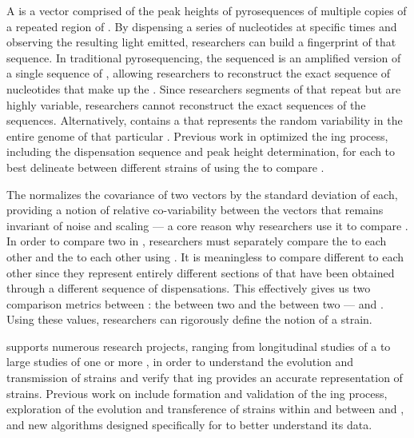 A \pyro{} is a vector comprised of the peak heights of pyrosequences of multiple copies of a repeated region of \dna{}.
By dispensing a series of nucleotides at specific times and observing the resulting light emitted, \cplop{} researchers can build a fingerprint of that \dna{} sequence.
In traditional pyrosequencing, the \dna{} sequenced is an amplified version of a single sequence of \dna{}, allowing researchers to reconstruct the exact sequence of nucleotides that make up the \dna{}.
Since \cplop{} researchers \pyro{} segments of \dna{} that repeat but are highly variable, researchers cannot reconstruct the exact sequences of the \itsshort{} sequences.
Alternatively, \cplop{} contains a \pyro{} that represents the random variability in the entire genome of that particular \ecoli{} \isol{}.
Previous work in \cite{Shealy:SeniorProject} optimized the \pyro{}ing process, including the dispensation sequence and peak height determination, for each \itsshort{} to best delineate between different strains of \ecoli{} using the \pearson{} to compare \pyros{}.

The \pearson{} \pcfunclabel{} normalizes the covariance of two vectors by the standard deviation of each, providing a notion of relative co-variability between the vectors that remains invariant of noise and scaling --- a core reason why \cplop{} researchers use it to compare \pyros{}.
In order to compare two \ecoli{} \isols{} in \cplop{}, researchers must separately compare the \Ssixt{} \pyros{} to each other and the \Sfive{} \pyros{} to each other using \pearson{}.
It is meaningless to compare different \itsshort{} to each other since they represent entirely different sections of \dna{} that have been obtained through a different sequence of dispensations.
This effectively gives us two comparison metrics between \isols{}: the \pearson{} between two \Ssixt{} and the \pearson{} \pyros{} between two \Sfive{} \pyros{} --- \pcsixt{} and \pcfive{}.
Using these values, \cplop{} researchers can rigorously define the notion of a strain.

\cplop{} supports numerous research projects, ranging from longitudinal studies of a \host{} to large studies of one or more \spec{}, in order to understand the evolution and transmission of \ecoli{} strains and verify that \pyro{}ing provides an accurate representation of \ecoli{} strains.
Previous work on \cplop{} include formation and validation of the \pyro{}ing process, exploration of the evolution and transference of \ecoli{} strains within and between \host{} and \spec{}, and new algorithms designed specifically for \cplop{} to better understand its data.

